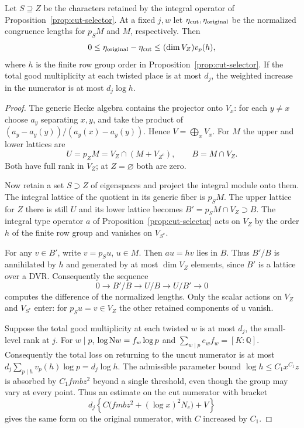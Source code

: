 \begin{lemma}
Let \(S\supseteq Z\) be the characters retained by the integral operator of Proposition~\ref{prop:cut-selector}. At a fixed
\(j,w\) let \(\eta_{\rm cut},\eta_{\rm original}\) be the normalized
congruence lengths for \(p_SM\) and \(M\), respectively. Then
\[
 0\le\eta_{\rm original}-\eta_{\rm cut}
           \le(\dim V_Z)v_p(h),
\]
where \(h\) is the finite row group order in
Proposition~\ref{prop:cut-selector}. If the total good multiplicity
at each twisted place is at most \(d_j\), the weighted increase in
the numerator is at most \(d_j\log h\).
\end{lemma}
\begin{proof}
The generic Hecke algebra contains the projector onto \(V_x\):
for each \(y\ne x\) choose \(a_y\) separating \(x,y\), and take the
product of \((a_y-a_y(y))/(a_y(x)-a_y(y))\). Hence
\(V=\bigoplus_x V_x\). For \(M\) the upper and lower lattices are
\[
 U=p_ZM=V_Z\cap(M+V_{Z^c}),\qquad B=M\cap V_Z.
\]
Both have full rank in \(V_Z\); at \(Z=\varnothing\) both are zero.

Now retain a set \(S\supset Z\) of eigenspaces and project the
integral module onto them. The integral lattice of the quotient
in its generic fiber is \(p_S M\). The upper lattice for \(Z\) there
is still \(U\) and its lower lattice becomes
\(B'=p_S M\cap V_Z\supset B\). The integral type operator
\(a\) of Proposition~\ref{prop:cut-selector} acts on \(V_Z\) by
the order \(h\) of the finite row group and vanishes on
\(V_{S^c}\).

For any \(v\in B'\), write \(v=p_S u\),
\(u\in M\). Then \(a u=h v\) lies in \(B\). Thus \(B'/B\) is
annihilated by \(h\) and generated by at most \(\dim V_Z\) elements,
since \(B'\) is a lattice over a DVR. Consequently the sequence
\[
 0\longrightarrow B'/B\longrightarrow U/B
        \longrightarrow U/B'\longrightarrow0
\]
computes the difference of the normalized lengths. Only the scalar
actions on \(V_Z\) and \(V_{S^c}\) enter: for \(p_Su=v\in V_Z\)
the other retained components of \(u\) vanish.

Suppose the total good multiplicity at each twisted \(w\) is at
most \(d_j\), the small-level rank at \(j\). For \(w\mid p\),
\(\log {\rm N}w=f_w\log p\) and
\(\sum_{w\mid p}e_w f_w=[K:\mathbb Q]\).
Consequently the total loss on returning to the uncut numerator is
at most \(d_j\sum_{p\mid h} v_p(h)\log p=d_j\log h\).
The admissible parameter bound \(\log h\le C_1 x^{C_1} z\)
is absorbed by \(C_1 fmbz^2\) beyond a single threshold, even
though the group may vary at every point. Thus an estimate on the
cut numerator with bracket
\[
 d_j\left\{C\big(fmbz^2+(\log x)^2N_c\big)+V\right\}
 \tag{*}\label{eq:local-division-star}
\]
gives the same form on the original numerator, with \(C\) increased
by \(C_1\).

\end{proof}
